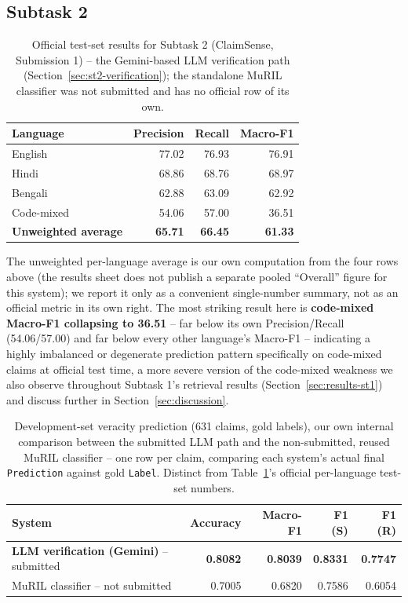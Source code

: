\documentclass[
]{ceurart}
\begin{document}
\subsection{Subtask 2}
\label{sec:results-st2}

\begin{table}[h]
  \centering
  \caption{Official test-set results for Subtask 2 (ClaimSense,
    Submission 1) -- the Gemini-based LLM verification path
    (Section~\ref{sec:st2-verification}); the standalone MuRIL
    classifier was not submitted and has no official row of its own.}
  \label{tab:st2-official}
  \small
  \begin{tabular}{@{}lrrr@{}}
    \toprule
    Language & Precision & Recall & Macro-F1 \\
    \midrule
    English & 77.02 & 76.93 & 76.91 \\
    Hindi & 68.86 & 68.76 & 68.97 \\
    Bengali & 62.88 & 63.09 & 62.92 \\
    Code-mixed & 54.06 & 57.00 & 36.51 \\
    \midrule
    \textbf{Unweighted average} & \textbf{65.71} & \textbf{66.45} & \textbf{61.33} \\
    \bottomrule
  \end{tabular}
\end{table}

The unweighted per-language average is our own computation from the
four rows above (the results sheet does not publish a separate pooled
``Overall'' figure for this system); we report it only as a convenient
single-number summary, not as an official metric in its own right. The
most striking result here is \textbf{code-mixed Macro-F1 collapsing to
36.51} -- far below its own Precision/Recall (54.06/57.00) and far
below every other language's Macro-F1 -- indicating a highly imbalanced
or degenerate prediction pattern specifically on code-mixed claims at
official test time, a more severe version of the code-mixed weakness we
also observe throughout Subtask 1's retrieval results
(Section~\ref{sec:results-st1}) and discuss further in
Section~\ref{sec:discussion}.

\begin{table}[h]
  \centering
  \caption{Development-set veracity prediction (631 claims, gold
    labels), our own internal comparison between the submitted LLM path
    and the non-submitted, reused MuRIL classifier -- one row per
    claim, comparing each system's actual final \texttt{Prediction}
    against gold \texttt{Label}. Distinct from Table~\ref{tab:st2-official}'s
    official per-language test-set numbers.}
  \label{tab:st2-dev}
  \small
  \begin{tabular}{@{}lrrrr@{}}
    \toprule
    System & Accuracy & Macro-F1 & F1 (S) & F1 (R) \\
    \midrule
    \textbf{LLM verification (Gemini)} -- submitted & \textbf{0.8082} & \textbf{0.8039} & \textbf{0.8331} & \textbf{0.7747} \\
    MuRIL classifier -- not submitted & 0.7005 & 0.6820 & 0.7586 & 0.6054 \\
    \bottomrule
  \end{tabular}
\end{table}
\end{document}
